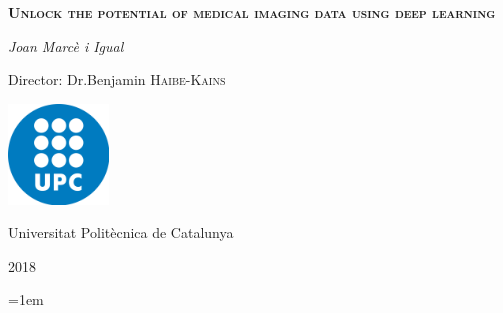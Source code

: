\documentclass[a4paper, 12pt]{article}
\begin{document}
\begin{titlepage}
    \centering
    \vspace{1.5cm}
    {\huge \textbf{\textsc{Unlock the potential of medical imaging data using deep learning}} \par}
    \vspace{2cm}
    {\Large \textit{Joan Marcè i Igual}\par}
    \vfill
    Director: Dr.Benjamin \textsc{Haibe-Kains}
    
    \vfill

    \includegraphics[width=0.2\textwidth]{images/logo_upc}\par\vspace{1cm}
    \vfill
    
    {\LARGE Universitat Politècnica de Catalunya \par}
    {\LARGE 2018 \par}
\end{titlepage}

\tableofcontents

\pagebreak



\pagebreak
\emergencystretch=1em
\printbibliography{}
\end{document}
